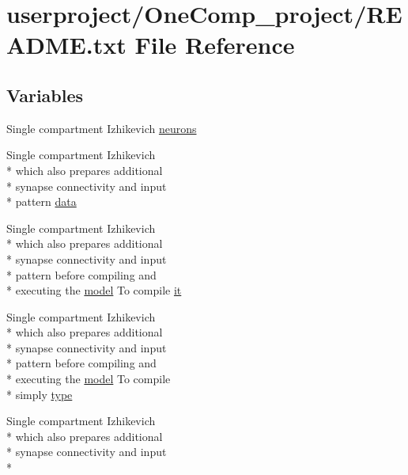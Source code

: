 \hypertarget{userproject_2OneComp__project_2README_8txt}{\section{userproject/\+One\+Comp\+\_\+project/\+R\+E\+A\+D\+M\+E.txt File Reference}
\label{userproject_2OneComp__project_2README_8txt}
}
\subsection*{Variables}
\begin{DoxyCompactItemize}
\item 
Single compartment Izhikevich \hyperlink{userproject_2OneComp__project_2README_8txt_ac7a6d74e1c2be02dc4098eb4c1651e97}{neurons}
\item 
Single compartment Izhikevich \\*
which also prepares additional \\*
synapse connectivity and input \\*
pattern \hyperlink{userproject_2OneComp__project_2README_8txt_a1493f995b682ed3e1bb3433b226ad309}{data}
\item 
Single compartment Izhikevich \\*
which also prepares additional \\*
synapse connectivity and input \\*
pattern before compiling and \\*
executing the \hyperlink{README_8txt_a69fd801b7213948c12d9dd7eebb3ed14}{model} To compile \hyperlink{userproject_2OneComp__project_2README_8txt_a02e2c25b919353f28335b274ab672306}{it}
\item 
Single compartment Izhikevich \\*
which also prepares additional \\*
synapse connectivity and input \\*
pattern before compiling and \\*
executing the \hyperlink{README_8txt_a69fd801b7213948c12d9dd7eebb3ed14}{model} To compile \\*
simply \hyperlink{userproject_2OneComp__project_2README_8txt_af296ec059814f76305adc5b27e99faf1}{type}
\item 
Single compartment Izhikevich \\*
which also prepares additional \\*
synapse connectivity and input \\*

\end{DoxyCompactItemize}

